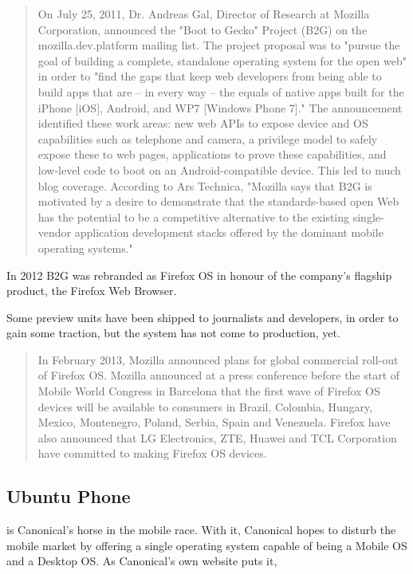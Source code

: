 \begin{quotation}
On July 25, 2011, Dr. Andreas Gal, Director of Research at Mozilla Corporation, announced the "Boot to Gecko" Project (B2G) on the mozilla.dev.platform mailing list. The project proposal was to "pursue the goal of building a complete, standalone operating system for the open web" in order to "find the gaps that keep web developers from being able to build apps that are – in every way – the equals of native apps built for the iPhone [iOS], Android, and WP7 [Windows Phone 7]." The announcement identified these work areas: new web APIs to expose device and OS capabilities such as telephone and camera, a privilege model to safely expose these to web pages, applications to prove these capabilities, and low-level code to boot on an Android-compatible device.
This led to much blog coverage. According to Ars Technica, "Mozilla says that B2G is motivated by a desire to demonstrate that the standards-based open Web has the potential to be a competitive alternative to the existing single-vendor application development stacks offered by the dominant mobile operating systems."
\cite{wikipedia:firefox}
\end{quotation}

In 2012 B2G was rebranded as Firefox OS in honour of the company's flagship product, the Firefox Web Browser.


Some preview units have been shipped to journalists and developers, in order to gain some traction, but the system has not come to production, yet. 

\begin{quotation}
In February 2013, Mozilla announced plans for global commercial roll-out of Firefox OS. Mozilla announced at a press conference before the start of Mobile World Congress in Barcelona that the first wave of Firefox OS devices will be available to consumers in Brazil, Colombia, Hungary, Mexico, Montenegro, Poland, Serbia, Spain and Venezuela. Firefox have also announced that LG Electronics, ZTE, Huawei and TCL Corporation have committed to making Firefox OS devices.
\cite{wikipedia:firefox}
\end{quotation}

 

\subsection{Ubuntu Phone}
 is Canonical's horse in the mobile race. With it, Canonical hopes to disturb the mobile market by offering a single operating system capable of being a Mobile OS and a Desktop OS. As Canonical's own website puts it, 

